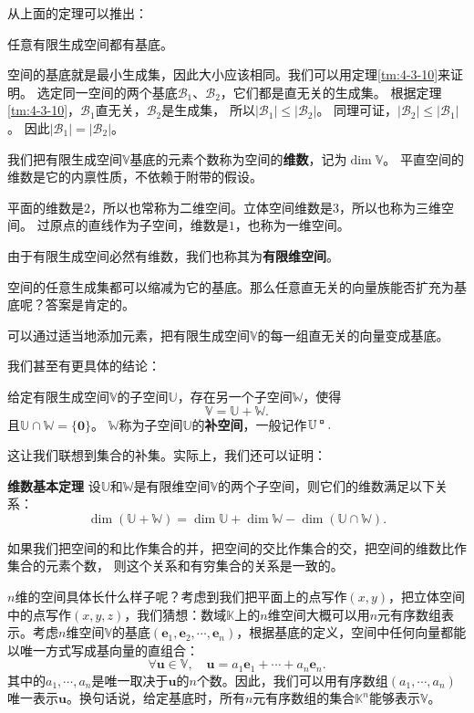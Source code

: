 \documentclass[12pt,UTF8]{ctexbook}
\begin{document}
从上面的定理可以推出：
\begin{tm}\label{tm:4-3-50}
    任意有限生成空间都有基底。
\end{tm}

空间的基底就是最小生成集，因此大小应该相同。我们可以用定理\ref{tm:4-3-10}来证明。
选定同一空间的两个基底$\mathcal{B}_1$、$\mathcal{B}_2$，它们都是直无关的生成集。
根据定理\ref{tm:4-3-10}，$\mathcal{B}_1$直无关，$\mathcal{B}_2$是生成集，
所以$|\mathcal{B}_1| \leqslant |\mathcal{B}_2|$。
同理可证，$|\mathcal{B}_2| \leqslant |\mathcal{B}_1|$。
因此$|\mathcal{B}_1| = |\mathcal{B}_2|$。

我们把有限生成空间$\mathbb{V}$基底的元素个数称为空间的\textbf{维数}，记为$\dim \mathbb{V}$。
平直空间的维数是它的内禀性质，不依赖于附带的假设。

平面的维数是$2$，所以也常称为二维空间。立体空间维数是$3$，所以也称为三维空间。
过原点的直线作为子空间，维数是$1$，也称为一维空间。

由于有限生成空间必然有维数，我们也称其为\textbf{有限维空间}。

空间的任意生成集都可以缩减为它的基底。那么任意直无关的向量族能否扩充为基底呢？答案是肯定的。
\begin{tm}\label{tm:4-3-60}
    可以通过适当地添加元素，把有限生成空间$\mathbb{V}$的每一组直无关的向量变成基底。
\end{tm}

我们甚至有更具体的结论：
\begin{tm}\label{tm:4-3-70}
    给定有限生成空间$\mathbb{V}$的子空间$\mathbb{U}$，存在另一个子空间$\mathbb{W}$，使得
    $$ \mathbb{V} = \mathbb{U} + \mathbb{W}.$$
    且$\mathbb{U} \cap \mathbb{W} = \{\mathbf{0}\}$。
    $\mathbb{W}$称为子空间$\mathbb{U}$的\textbf{补空间}，一般记作$\mathbb{U}^{\bu}.$
\end{tm}

这让我们联想到集合的补集。实际上，我们还可以证明：

\begin{tm}{\textbf{维数基本定理}}\label{tm:4-3-80}
    设$\mathbb{U}$和$\mathbb{W}$是有限维空间$\mathbb{V}$的两个子空间，则它们的维数满足以下关系：
    $$ \dim (\mathbb{U} + \mathbb{W}) = \dim \mathbb{U} + \dim \mathbb{W} - \dim (\mathbb{U} \cap \mathbb{W}).$$
\end{tm}
如果我们把空间的和比作集合的并，把空间的交比作集合的交，把空间的维数比作集合的元素个数，
则这个关系和有穷集合的关系是一致的。

$n$维的空间具体长什么样子呢？考虑到我们把平面上的点写作$(x, y)$，把立体空间中的点写作$(x, y, z)$，我们猜想：数域$\mathbb{K}$上的$n$维空间大概可以用$n$元有序数组表示。考虑$n$维空间$\mathbb{V}$的基底$(\mathbf{e}_1, \mathbf{e}_2, \cdots, \mathbf{e}_n)$，根据基底的定义，空间中任何向量都能以唯一方式写成基向量的直组合：
$$ \forall \mathbf{u} \in \mathbb{V}, \quad \mathbf{u} = a_1\mathbf{e}_1 + \cdots + a_n \mathbf{e}_n. $$
其中的$a_1, \cdots , a_n$是唯一取决于$\mathbf{u}$的$n$个数。因此，我们可以用有序数组$(a_1, \cdots , a_n)$唯一表示$\mathbf{u}$。换句话说，给定基底时，所有$n$元有序数组的集合$\mathbb{K}^n$能够表示$\mathbb{V}$。
\end{document}
